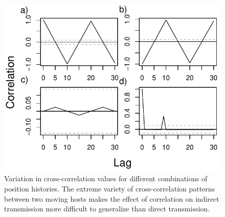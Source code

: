 \documentclass[11pt]{article}
\begin{document}
\begin{figure}
    \includegraphics[width=\textwidth]{figures/example_xcorrs.pdf}
    \caption{Variation in cross-correlation values for different combinations of position histories. The extreme variety of cross-correlation patterns between two moving hosts makes the effect of correlation on indirect transmission more difficult to generalize than direct transmission.}
    \label{fig:xcorrs}
\end{figure}
\end{document}

